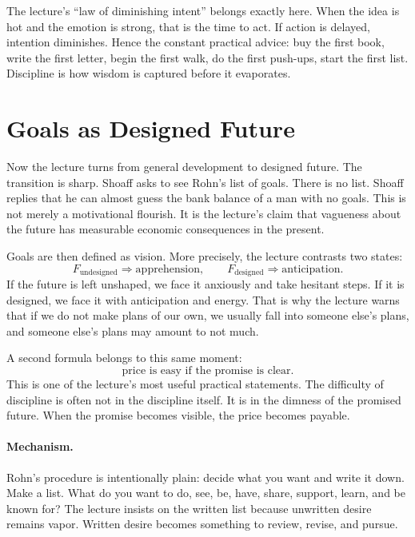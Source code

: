 The lecture's ``law of diminishing intent'' belongs exactly here. When the idea is hot and the emotion is strong, that is the time to act. If action is delayed, intention diminishes. Hence the constant practical advice: buy the first book, write the first letter, begin the first walk, do the first push-ups, start the first list. Discipline is how wisdom is captured before it evaporates.

\section{Goals as Designed Future}

Now the lecture turns from general development to designed future. The transition is sharp. Shoaff asks to see Rohn's list of goals. There is no list. Shoaff replies that he can almost guess the bank balance of a man with no goals. This is not merely a motivational flourish. It is the lecture's claim that vagueness about the future has measurable economic consequences in the present.

Goals are then defined as vision. More precisely, the lecture contrasts two states:
\begin{equation}
F_{\text{undesigned}}\Rightarrow \mathrm{apprehension},
\qquad
F_{\text{designed}}\Rightarrow \mathrm{anticipation}.
\end{equation}
If the future is left unshaped, we face it anxiously and take hesitant steps. If it is designed, we face it with anticipation and energy. That is why the lecture warns that if we do not make plans of our own, we usually fall into someone else's plans, and someone else's plans may amount to not much.

A second formula belongs to this same moment:
\begin{equation}
\text{price is easy if the promise is clear}.
\end{equation}
This is one of the lecture's most useful practical statements. The difficulty of discipline is often not in the discipline itself. It is in the dimness of the promised future. When the promise becomes visible, the price becomes payable.

\paragraph{Mechanism.} Rohn's procedure is intentionally plain: decide what you want and write it down. Make a list. What do you want to do, see, be, have, share, support, learn, and be known for? The lecture insists on the written list because unwritten desire remains vapor. Written desire becomes something to review, revise, and pursue.

